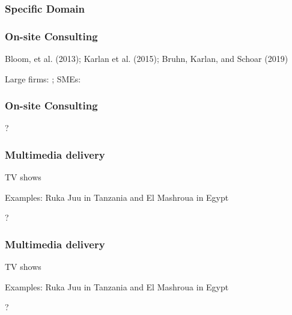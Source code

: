 \documentclass[hideothersubsections, usenames,dvipsnames,10pt]{beamer}
\newenvironment{itemize_3pt}{\itemize\addtolength{\itemsep}{3pt}}{\enditemize}
\begin{document}
\begin{frame}
\frametitle{Specific Domain}
	\begin{itemize_3pt}
	\item \citep{Anderson2018}
	\vspace{0.1in}
	\end{itemize_3pt}
\end{frame}


\begin{frame}
\frametitle{On-site Consulting}
	\begin{itemize_3pt}
	\item Bloom, et al. (2013); Karlan et al. (2015); Bruhn, Karlan, and Schoar (2019)
	\item Large firms: \citep{Bloom2013}; SMEs: \citep{Bruhn2018}
	\item \citep{Karlan2015} \citep{Bruhn2019}
	\vspace{0.1in}
	\end{itemize_3pt}
\end{frame}

\begin{frame}
\frametitle{On-site Consulting}
	\begin{itemize_3pt}
	\item ?
	\vspace{0.1in}
	\end{itemize_3pt}
\end{frame}


\begin{frame}
\frametitle{Multimedia delivery}
	TV shows
	\begin{itemize_3pt}
	\item Examples: Ruka Juu in Tanzania \citep{Bjorvatn2020} and El Mashroua in Egypt \citep{Barsoum2018}
	\item ?
	\vspace{0.1in}
	\end{itemize_3pt}
\end{frame}

\begin{frame}
\frametitle{Multimedia delivery}
	TV shows
	\begin{itemize_3pt}
	\item Examples: Ruka Juu in Tanzania \citep{Bjorvatn2020} and El Mashroua in Egypt \citep{Barsoum2018}
	\item ?
	\vspace{0.1in}
	\end{itemize_3pt}
\end{frame}
\end{document}
